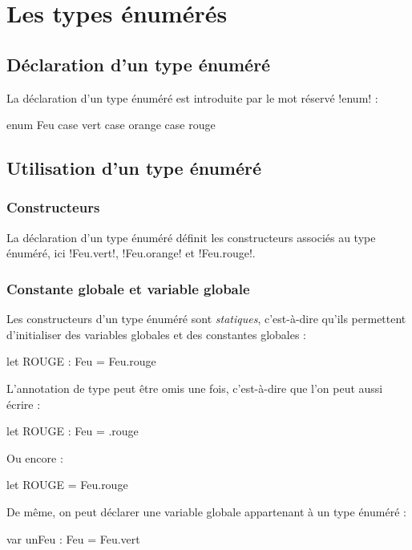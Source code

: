 




\chapter{Les types énumérés}


\section{Déclaration d'un type énuméré}

La déclaration d'un type énuméré est introduite par le mot réservé \plm!enum! :

\begin{PLM}
enum Feu {
  case vert
  case orange
  case rouge
}
\end{PLM}

\section{Utilisation d'un type énuméré}

\subsection{Constructeurs}
La déclaration d'un type énuméré définit les constructeurs associés au type énuméré, ici \plm!Feu.vert!, \plm!Feu.orange! et \plm!Feu.rouge!.


\subsection{Constante globale et variable globale}
Les constructeurs d'un type énuméré sont \emph{statiques}, c'est-à-dire qu'ils permettent d'initialiser des variables globales et des constantes globales :

\begin{PLM}
let ROUGE : Feu = Feu.rouge
\end{PLM}

L'annotation de type peut être omis une fois, c'est-à-dire que l'on peut aussi écrire :
\begin{PLM}
let ROUGE : Feu = .rouge
\end{PLM}

Ou encore :
\begin{PLM}
let ROUGE = Feu.rouge
\end{PLM}


De même, on peut déclarer une variable globale appartenant à un type énuméré :
\begin{PLM}
var unFeu : Feu = Feu.vert
\end{PLM}

